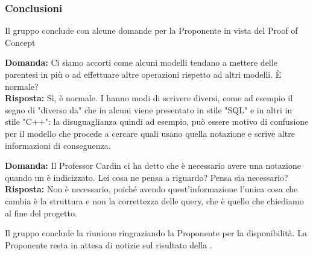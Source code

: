 \subsubsection{Conclusioni}
\par Il gruppo conclude con alcune domande per la Proponente in vista del Proof of Concept

\par \textbf{Domanda:} Ci siamo accorti come alcuni modelli tendano a mettere delle parentesi in più o ad effettuare altre operazioni rispetto ad altri modelli. È normale? \\
\textbf{Risposta:} Sì, è normale. I  hanno modi di scrivere diversi, come ad esempio il segno di "diverso da" che in alcuni viene presentato in stile "SQL" e in altri in stile "C++": la disuguaglianza quindi ad esempio, può essere motivo di confusione per il modello che procede a cercare quali  usano quella notazione e scrive altre informazioni di conseguenza.

\par \textbf{Domanda:} Il Professor Cardin ci ha detto che è necessario avere una notazione quando un  è indicizzato. Lei cosa ne pensa a riguardo? Pensa sia necessario? \\
\textbf{Risposta:} Non è necessario, poiché avendo quest'informazione l'unica cosa che cambia è la struttura e non la correttezza delle query, che è quello che chiediamo al fine del progetto.

\par Il gruppo conclude la riunione ringraziando la Proponente per la disponibilità. La Proponente resta in attesa di notizie sul risultato della \RTB.